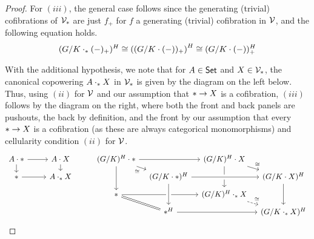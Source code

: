 \documentclass[a4paper,10pt
,draft
]{article}%
\renewcommand{\1}{\eta}%
\begin{document}
{\begin{proof}
        For $(iii)$, the general case follows since
        the generating (trivial) cofibrations of $\V_{\**}$ are just $f_+$ for $f$ a generating (trivial) cofibration in $\mathcal V$,
        and the following equation holds.
        \begin{equation}
              (G/K \cdot_{\**} (-)_+)^H \cong \left( (G/K \cdot (-))_+ \right)^H \cong (G/K \cdot (-))^H_+
        \end{equation}

        With the additional hypothesis, we note that for $A \in \mathsf{Set}$ and $X \in \V_{\**}$, the canonical copowering $A \cdot_{\**} X$ in $\V_{\**}$ is given by the diagram on the left below.
        Thus, using $(ii)$ for $\mathcal V$ and our assumption that $\** \to X$ is a cofibration, $(iii)$ follows by the diagram on the right,
        where both the front and back panels are pushouts, the back by definition, and the front by our assumption that every $\** \to X$ is a cofibration (as these are always categorical monomorphisms) and cellularity condition $(ii)$ for $\mathcal V$.      
        \begin{equation}
              \begin{tikzcd}[row sep = tiny]
                    A \cdot \** \arrow[d] \arrow[r]
                    &
                    A \cdot X \arrow[d]
                    & %
                    (G/K)^H \cdot \** \arrow[dd] \arrow[rr] \arrow[dr, "\cong"']
                    &[-15pt]&[-15pt]
                    (G/K)^H \cdot X \arrow[dd] \arrow[dr, "\cong"]
                    \\
                    \** \arrow[r]
                    &
                    A \cdot_{\**} X
                    & %
                    &
                    (G/K \cdot \**)^H \arrow[rr, crossing over]
                    &&[-15pt]
                    (G/K \cdot X)^H \arrow[dd]
                    \\
                    && %
                    \** \arrow[rr] \arrow[dr, equal]
                    &&
                    (G/K)^H \cdot_{\**} X \arrow[dr, dashed, "\cong"]
                    \\
                    && %
                    & \**^H \arrow[rr] \arrow[uu, leftarrow, crossing over]
                    &&
                    (G/K \cdot_{\**} X)^H
              \end{tikzcd}
        \end{equation}
  \end{proof}

}
\end{document}
